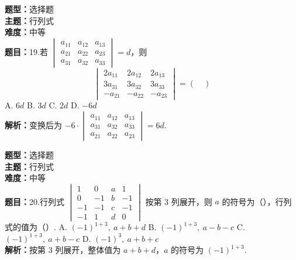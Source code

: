 \documentclass{ctexart}
\newenvironment{question}[5]{%
	\noindent\textbf{题型：}#1\\
	\textbf{主题：}#2\\
	\textbf{难度：}#3\\
	\textbf{题目：}#4\\
	\textbf{解析：}#5\\
	\vspace{1em}
}{}
\begin{document}
	\begin{question}
		{选择题}
		{行列式}
		{中等}
		{19.若 \(\begin{vmatrix}a_{11} & a_{12} & a_{13} \\ a_{21} & a_{22} & a_{23} \\ a_{31} & a_{32} & a_{33}\end{vmatrix} = d\)，则
			\[
			\begin{vmatrix}
				2 a_{11} & 2 a_{12} & 2 a_{13} \\
				3 a_{31} & 3 a_{32} & 3 a_{33} \\
				-a_{21} & -a_{22} & -a_{23}
			\end{vmatrix} = (\quad)
			\]
			A. \(6d\) \quad B. \(3d\) \quad C. \(2d\) \quad D. \(-6d\)}
		{变换后为 \(-6 \cdot \begin{vmatrix}a_{11} & a_{12} & a_{13} \\ a_{31} & a_{32} & a_{33} \\ a_{21} & a_{22} & a_{23}\end{vmatrix} = 6d\). }
	\end{question}
	
	\begin{question}
		{选择题}
		{行列式}
		{中等}
		{20.行列式 \(\begin{vmatrix}1 & 0 & a & 1 \\ 0 & -1 & b & -1 \\ -1 & -1 & c & -1 \\ -1 & 1 & d & 0\end{vmatrix}\) 按第 3 列展开，则 \(a\) 的符号为（\quad），行列式的值为（\quad）. A. \((-1)^{1+3},\ a + b + d\) \quad B. \((-1)^{1+3},\ a - b - c\) \quad C. \((-1)^{1+3},\ a + b - c\) \quad D. \((-1)^3,\ a + b + c\)}
		{按第 3 列展开，整体值为 \(a + b + d\)，\(a\) 的符号为 \((-1)^{1+3}\). }
	\end{question}
	
\end{document}
